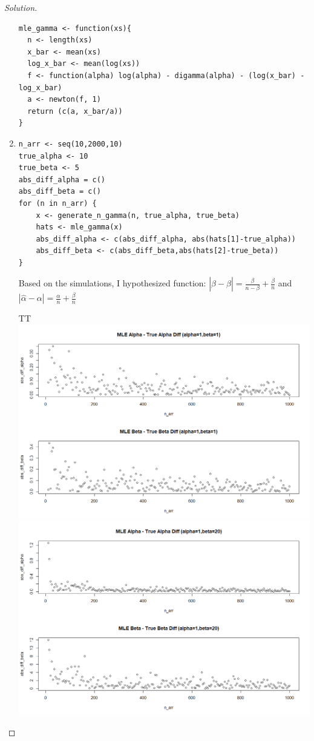\documentclass{article}
\newenvironment{solution}
  {\renewcommand\qedsymbol{$\blacksquare$}\begin{proof}[Solution]$ $}
  {\end{proof}}
\let \extra T
\begin{document}
\begin{Exercise}
\begin{solution}
\begin{enumerate}[label=(\roman*)]
\begin{verbatim}
mle_gamma <- function(xs){
  n <- length(xs)
  x_bar <- mean(xs)
  log_x_bar <- mean(log(xs))
  f <- function(alpha) log(alpha) - digamma(alpha) - (log(x_bar) - log_x_bar)
  a <- newton(f, 1)
  return (c(a, x_bar/a))
} 
                  \end{verbatim}
            \item
                  \begin{verbatim}
n_arr <- seq(10,2000,10)
true_alpha <- 10
true_beta <- 5
abs_diff_alpha = c()
abs_diff_beta = c()
for (n in n_arr) {
    x <- generate_n_gamma(n, true_alpha, true_beta)
    hats <- mle_gamma(x)
    abs_diff_alpha <- c(abs_diff_alpha, abs(hats[1]-true_alpha))
    abs_diff_beta <- c(abs_diff_beta,abs(hats[2]-true_beta))
} 
            \end{verbatim}
                  \fi


                  Based on the simulations, I hypothesized function: \(|\hat \beta - \beta| = \frac{\beta}{n-\beta} + \frac{\beta}{n}\) and \(|\hat \alpha - \alpha| = \frac{\alpha}{n} + \frac{\beta}{n}\)


                  \if \extra T
                      \includegraphics[scale=0.25]{abs_diff.png}
                      \includegraphics[scale=0.25]{abs_diff_2.png}


\end{enumerate}
\end{solution}
\end{Exercise}
\end{document}
